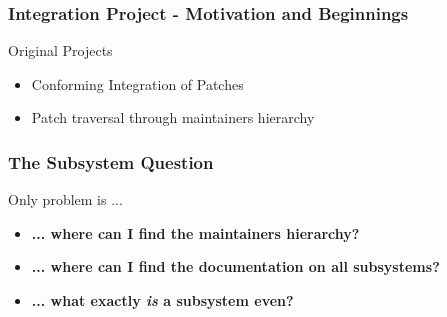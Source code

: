 \documentclass[9pt]{beamer}
\begin{document}
	\begin{frame}
	\frametitle{Integration Project - Motivation and Beginnings}
		\begin{block}{Original Projects}
			\begin{itemize}
				\item Conforming Integration of Patches
				\item Patch traversal through maintainers hierarchy
			\end{itemize}
		\end{block}
	\end{frame}



	\begin{frame}
	\frametitle{The Subsystem Question}
		\begin{alertblock}{Only problem is ...}
			\begin{itemize}
				\item \textbf{... where can I find the maintainers hierarchy?}
				\item \textbf{... where can I find the documentation on all subsystems?}
				\item \textbf{... what exactly \textit{is} a subsystem even?}
			\end{itemize}
		\end{alertblock}
	\end{frame}
\end{document}
